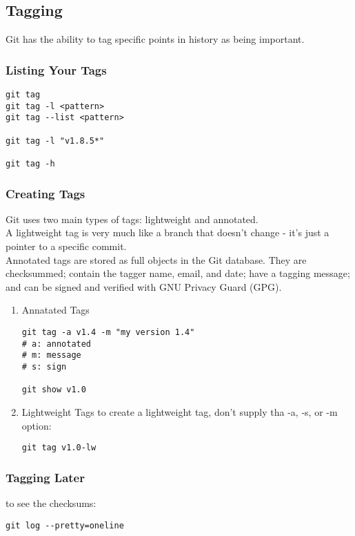 \documentclass[11pt]{article}
\begin{document}
\subsection{Tagging}
\label{sec:org4d03e6e}
Git has the ability to tag specific points in history as being important.\\

\subsubsection{Listing Your Tags}
\label{sec:org34aaa02}
\begin{verbatim}
git tag
git tag -l <pattern>
git tag --list <pattern>

git tag -l "v1.8.5*"

git tag -h
\end{verbatim}

\subsubsection{Creating Tags}
\label{sec:org3ebba5c}
Git uses two main types of tags: lightweight and annotated.\\
A lightweight tag is very much like a branch that doesn't change - it's just a pointer to a specific commit.\\
Annotated tags are stored as full objects in the Git database. They are checksummed; contain the tagger name, email, and date; have a tagging message; and can be signed and verified with GNU Privacy Guard (GPG).\\

\begin{enumerate}
\item Annatated Tags
\label{sec:orgd0a14f9}
\begin{verbatim}
git tag -a v1.4 -m "my version 1.4"
# a: annotated
# m: message
# s: sign

git show v1.0
\end{verbatim}


\item Lightweight Tags
\label{sec:orge25a775}
to create a lightweight tag, don't supply tha -a, -s, or -m option:\\
\begin{verbatim}
git tag v1.0-lw
\end{verbatim}
\end{enumerate}


\subsubsection{Tagging Later}
\label{sec:orgdba76ad}
to see the checksums:\\
\begin{verbatim}
git log --pretty=oneline
\end{verbatim}
\end{document}
